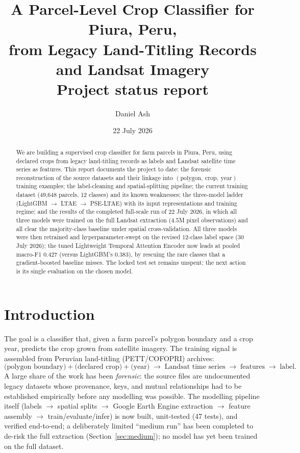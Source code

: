\documentclass[11pt,a4paper]{article}
\title{A Parcel-Level Crop Classifier for Piura, Peru,\\from Legacy Land-Titling Records and Landsat Imagery\\[0.5em]\large Project status report}
\author{Daniel Ash}
\date{22 July 2026}
\begin{document}
\maketitle

\begin{abstract}
\noindent We are building a supervised crop classifier for farm parcels in Piura, Peru, using
declared crops from legacy land-titling records as labels and Landsat satellite time series as
features. This report documents the project to date: the forensic reconstruction of the source
datasets and their linkage into $(\text{polygon},\ \text{crop},\ \text{year})$ training examples;
the label-cleaning and spatial-splitting pipeline; the current training dataset (49{,}648
parcels, 12 classes) and its known weaknesses; the three-model ladder (LightGBM $\to$ LTAE $\to$
PSE-LTAE) with its input representations and training regime; and the results of the completed
full-scale run of 22 July 2026, in which all three models were trained on the full Landsat
extraction ($4.5$M pixel observations) and all clear the majority-class baseline under spatial
cross-validation. All three models were then retrained and hyperparameter-swept on the revised
12-class label space (30 July 2026); the tuned Lightweight Temporal Attention Encoder now leads
at pooled macro-F1 $0.427$ (versus LightGBM's $0.383$), by rescuing the rare classes that a
gradient-boosted baseline misses. The locked test set remains unspent; the next action is its
single evaluation on the chosen model.
\end{abstract}

\section{Introduction}

The goal is a classifier that, given a farm parcel's polygon boundary and a crop year, predicts
the crop grown from satellite imagery. The training signal is assembled from Peruvian
land-titling (PETT/COFOPRI) archives:
\[
\text{(polygon boundary)} + \text{(declared crop)} + \text{(year)}
\;\longrightarrow\; \text{Landsat time series} \;\longrightarrow\; \text{features} \;\longrightarrow\; \text{label}.
\]
A large share of the work has been \emph{forensic}: the source files are undocumented legacy
datasets whose provenance, keys, and mutual relationships had to be established empirically
before any modelling was possible. The modelling pipeline itself
(labels $\to$ spatial splits $\to$ Google Earth Engine extraction $\to$ feature assembly $\to$
train/evaluate/infer) is now built, unit-tested (47 tests), and verified end-to-end; a
deliberately limited ``medium run'' has been completed to de-risk the full extraction
(Section~\ref{sec:medium}); no model has yet been trained on the full dataset.
\end{document}
